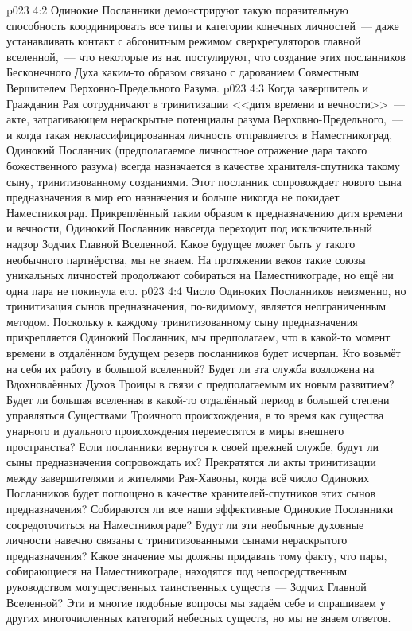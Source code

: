 \vs p023 4:2 Одинокие Посланники демонстрируют такую поразительную способность координировать все типы и категории конечных личностей~--- даже устанавливать контакт с абсонитным режимом сверхрегуляторов главной вселенной,~--- что некоторые из нас постулируют, что создание этих посланников Бесконечного Духа каким\hyp{}то образом связано с дарованием Совместным Вершителем Верховно\hyp{}Предельного Разума.
\vs p023 4:3 \pc Когда завершитель и Гражданин Рая сотрудничают в тринитизации <<дитя времени и вечности>>~--- акте, затрагивающем нераскрытые потенциалы разума Верховно\hyp{}Предельного,~--- и когда такая неклассифицированная личность отправляется в Наместникоград, Одинокий Посланник (предполагаемое личностное отражение дара такого божественного разума) всегда назначается в качестве хранителя\hyp{}спутника такому сыну, тринитизованному созданиями. Этот посланник сопровождает нового сына предназначения в мир его назначения и больше никогда не покидает Наместникоград. Прикреплённый таким образом к предназначению дитя времени и вечности, Одинокий Посланник навсегда переходит под исключительный надзор Зодчих Главной Вселенной. Какое будущее может быть у такого необычного партнёрства, мы не знаем. На протяжении веков такие союзы уникальных личностей продолжают собираться на Наместникограде, но ещё ни одна пара не покинула его.
\vs p023 4:4 Число Одиноких Посланников неизменно, но тринитизация сынов предназначения, по\hyp{}видимому, является неограниченным методом. Поскольку к каждому тринитизованному сыну предназначения прикрепляется Одинокий Посланник, мы предполагаем, что в какой\hyp{}то момент времени в отдалённом будущем резерв посланников будет исчерпан. Кто возьмёт на себя их работу в большой вселенной? Будет ли эта служба возложена на Вдохновлённых Духов Троицы в связи с предполагаемым их новым развитием? Будет ли большая вселенная в какой\hyp{}то отдалённый период в большей степени управляться Существами Троичного происхождения, в то время как существа унарного и дуального происхождения переместятся в миры внешнего пространства? Если посланники вернутся к своей прежней службе, будут ли сыны предназначения сопровождать их? Прекратятся ли акты тринитизации между завершителями и жителями Рая\hyp{}Хавоны, когда всё число Одиноких Посланников будет поглощено в качестве хранителей\hyp{}спутников этих сынов предназначения? Собираются ли все наши эффективные Одинокие Посланники сосредоточиться на Наместникограде? Будут ли эти необычные духовные личности навечно связаны с тринитизованными сынами нераскрытого предназначения? Какое значение мы должны придавать тому факту, что пары, собирающиеся на Наместникограде, находятся под непосредственным руководством могущественных таинственных существ~--- Зодчих Главной Вселенной? Эти и многие подобные вопросы мы задаём себе и спрашиваем у других многочисленных категорий небесных существ, но мы не знаем ответов.

